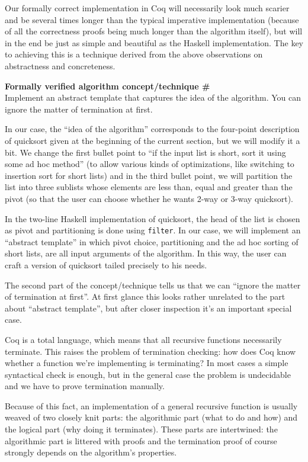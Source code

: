 \documentclass[declaration,mgr,english,shortabstract]{iithesis}
\newcommand{\m}[1]{\texttt{#1}}
\newcounter{cnt}
\newcommand{\runcnt}{\#\arabic{cnt}}
\newcommand{\concept}[1]
{
    \refstepcounter{cnt}
    \begin{center}
        \textbf{Formally verified algorithm concept/technique \runcnt} \\
        #1
    \end{center}
}
\begin{document}
Our formally correct implementation in Coq will necessarily look much scarier and be several times longer than the typical imperative implementation (because of all the correctness proofs being much longer than the algorithm itself), but will in the end be just as simple and beautiful as the Haskell implementation. The key to achieving this is a technique derived from the above observations on abstractness and concreteness.

\concept{Implement an abstract template that captures the idea of the algorithm. You can ignore the matter of termination at first.}

In our case, the ``idea of the algorithm'' corresponds to the four-point description of quicksort given at the beginning of the current section, but we will modify it a bit. We change the first bullet point to ``if the input list is short, sort it using some ad hoc method'' (to allow various kinds of optimizations, like switching to insertion sort for short lists) and in the third bullet point, we will partition the list into three sublists whose elements are less than, equal and greater than the pivot (so that the user can choose whether he wants 2-way or 3-way quicksort).

In the two-line Haskell implementation of quicksort, the head of the list is chosen as pivot and partitioning is done using \m{filter}. In our case, we will implement an ``abstract template'' in which pivot choice, partitioning and the ad hoc sorting of short lists, are all input arguments of the algorithm. In this way, the user can craft a version of quicksort tailed precisely to his needs.

The second part of the concept/technique tells us that we can ``ignore the matter of termination at first''. At first glance this looks rather unrelated to the part about ``abstract template'', but after closer inspection it's an important special case.

Coq is a total language, which means that all recursive functions necessarily terminate. This raises the problem of termination checking: how does Coq know whether a function we're implementing is terminating? In most cases a simple syntactical check is enough, but in the general case the problem is undecidable and we have to prove termination manually.

Because of this fact, an implementation of a general recursive function is usually weaved of two closely knit parts: the algorithmic part (what to do and how) and the logical part (why doing it terminates). These parts are intertwined: the algorithmic part is littered with proofs and the termination proof of course strongly depends on the algorithm's properties.
\end{document}
